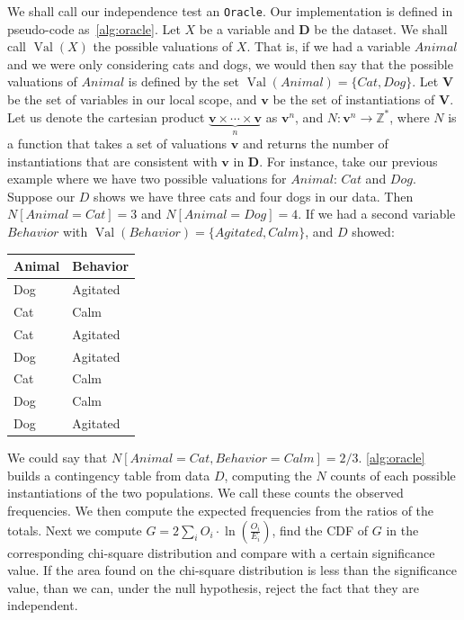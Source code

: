 \documentclass{amsart}
\DeclareMathOperator*{\Val}{\text{Val}}
\theoremstyle{plain}
\numberwithin{equation}{section}
\newcommand{\set}[1]{\mathbf{#1}}
\newcommand{\code}[1]{\lstinline[mathescape=true]{#1}}
\begin{document}
We shall call our independence test an \code{Oracle}. Our implementation is defined in pseudo-code
as~\autoref{alg:oracle}. Let $X$ be a variable and $\set{D}$ be the dataset. We shall call
$\Val(X)$ the possible valuations of $X$. That is, if we had a variable $Animal$ and we were only
considering cats and dogs, we would then say that the possible valuations of $Animal$ is defined
by the set $\Val(Animal)=\{Cat, Dog\}$. Let $\set{V}$ be the set of variables in our local scope,
and $\set{v}$ be the set of instantiations of $\set{V}$. Let us denote the cartesian product
$\underbrace{\set{v}\times\cdots\times\set{v}}_n$ as $\set{v}^n$, and $N:\set{v}^n\to
\mathbb{Z^*}$, where $N$ is a function that takes a set of valuations $\set{v}$ and returns the
number of instantiations that are consistent with $\set{v}$ in $\set{D}$. For instance, take our
previous example where we have two possible valuations for $Animal$: $Cat$ and $Dog$. Suppose our
$D$ shows we have three cats and four dogs in our data. Then $N[Animal=Cat]=3$ and
$N[Animal=Dog]=4$. If we had a second variable $Behavior$ with $\Val(Behavior)=\{Agitated, Calm\}$,
and $D$ showed:

\begin{tabular}{l l}
  \textbf{Animal} & \textbf{Behavior}\\
  \midrule
  Dog    & Agitated\\
  Cat    & Calm\\
  Cat    & Agitated\\
  Dog    & Agitated\\
  Cat    & Calm\\
  Dog    & Calm\\
  Dog    & Agitated\\
\end{tabular}

We could say that $N[Animal=Cat, Behavior=Calm]=2/3$. \autoref{alg:oracle} builds a contingency
table from data $D$, computing the $N$ counts of each possible instantiations of the two
populations. We call these counts the observed frequencies. We then compute the expected
frequencies from the ratios of the totals. Next we compute $G=2\sum_i O_i\cdot\ln\left(
\frac{O_i}{E_i}\right)$, find the CDF of $G$ in the corresponding chi-square distribution and
compare with a certain significance value. If the area found on the chi-square distribution is
less than the significance value, than we can, under the null hypothesis, reject the fact that
they are independent.
\end{document}
